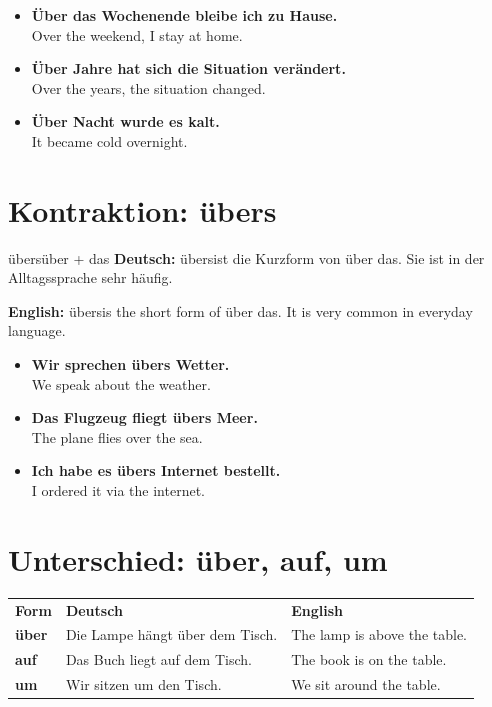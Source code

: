 \documentclass[a4paper,11pt]{article}
\newcommand{\GermanText}[1]{\textbf{Deutsch: }#1\par}
\newcommand{\EnglishText}[1]{{\small\color{SoftGray}\textbf{English: }#1\par}}
\newcommand{\ExampleItem}[2]{\item \textbf{#1}\\{\small\color{SoftGray}#2}}
\begin{document}
\begin{exbox}
\begin{itemize}
    \ExampleItem{Über das Wochenende bleibe ich zu Hause.}{Over the weekend, I stay at home.}
    \ExampleItem{Über Jahre hat sich die Situation verändert.}{Over the years, the situation changed.}
    \ExampleItem{Über Nacht wurde es kalt.}{It became cold overnight.}
\end{itemize}
\end{exbox}

\section{Kontraktion: übers}

\begin{grammarentry}{übers}{über + das}
\GermanText{\glqq übers\grqq ist die Kurzform von \glqq über das\grqq. Sie ist in der Alltagssprache sehr häufig.}
\EnglishText{\glqq übers\grqq is the short form of \glqq über das\grqq. It is very common in everyday language.}
\end{grammarentry}

\begin{exbox}
\begin{itemize}
    \ExampleItem{Wir sprechen übers Wetter.}{We speak about the weather.}
    \ExampleItem{Das Flugzeug fliegt übers Meer.}{The plane flies over the sea.}
    \ExampleItem{Ich habe es übers Internet bestellt.}{I ordered it via the internet.}
\end{itemize}
\end{exbox}

\section{Unterschied: über, auf, um}

\begin{tabularx}{\textwidth}{>{\bfseries}p{}X X}
\rowcolor{HeaderBlueDark}
\color{white}\textbf{Form} & \color{white}\textbf{Deutsch} & \color{white}\textbf{English} \\
über & Die Lampe hängt über dem Tisch. & The lamp is above the table. \\
auf & Das Buch liegt auf dem Tisch. & The book is on the table. \\
um & Wir sitzen um den Tisch. & We sit around the table. \\
\end{tabularx}
\end{document}
